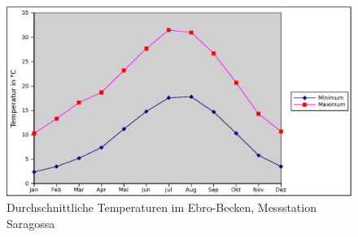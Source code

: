 \documentclass[11pt,a4paper]{article}
\begin{document}
\begin{figure}[h]
\centering
\includegraphics[width=\textwidth]{./ebro-temperatur}
\caption{Durchschnittliche Temperaturen im Ebro-Becken, Messstation Saragossa}
\label{fig:ebro-temperatur}
\end{figure}
\end{document}
